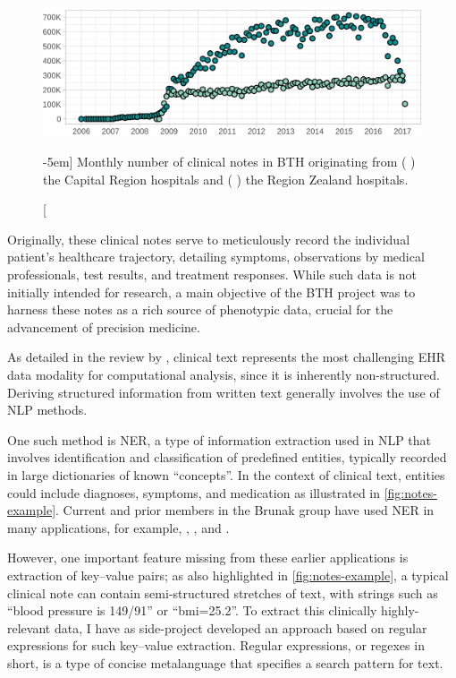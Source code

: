 \begin{figure}
    \includegraphics[width=\textwidth, trim=10mm 0 0 0]{graphics/bth-notes}
    \caption[Overview of \acs{BTH} clinical notes][-5em]{%
        Monthly number of clinical notes in \acf*{BTH}
        originating from 
        (\,\,) the Capital Region hospitals and 
        (\,\,) the Region Zealand hospitals.
    }
    \label{fig:notes-overview}
\end{figure}%

Originally, these clinical notes serve to meticulously record 
the individual patient's healthcare trajectory, detailing symptoms, 
observations by medical professionals, test results, 
and treatment responses.
While such data is not initially intended for research,
a main objective of the \ac{BTH} project was to harness
these notes as a rich source of phenotypic data,
crucial for the advancement of precision medicine.

As detailed in the review by \textcite{jensenMining2012}, 
clinical text represents the most challenging \ac{EHR} data modality for 
computational analysis, since it is inherently non-structured.
Deriving structured information from written text generally involves the
use of \ac{NLP} methods.
~\autocite{jensenMining2012}

One such method is \ac{NER}, a type of information extraction 
used in \ac{NLP} that involves identification and classification 
of predefined entities, typically recorded in large dictionaries
of known \enquote{concepts}.
In the context of clinical text,
entities could include diagnoses, symptoms, and medication
as illustrated in \cref{fig:notes-example}.
Current and prior members in the Brunak group 
have used \ac{NER} in many applications, 
for example,
\textcite{sorupSex2020},
\textcite{hjaltelinPancreatic2023},
and  
\textcite{kirkLinking2019}.

However, one important feature missing from these earlier applications 
is extraction of key--value pairs;
as also highlighted in \cref{fig:notes-example}, 
a typical clinical note can contain
semi-structured stretches of text,
with strings such as \enquote{blood pressure is 149/91}
or \enquote{bmi=25.2}.
To extract this clinically highly-relevant data,
I have as side-project developed an approach based 
on regular expressions for such key--value extraction.
Regular expressions, or regexes in short, 
is a type of concise metalanguage 
that specifies a search pattern for text.
~\autocite{Regular2023}

